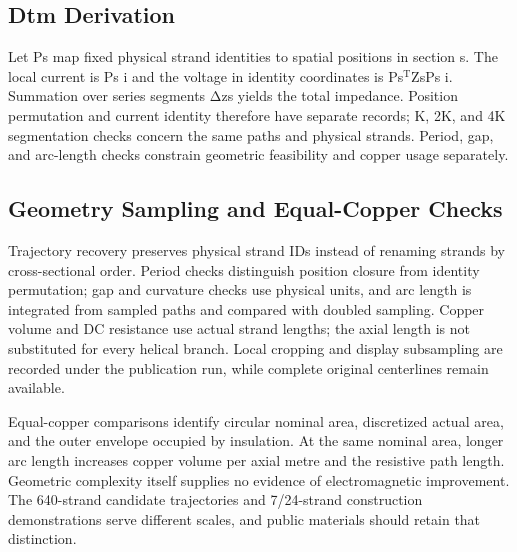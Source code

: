 \documentclass[11pt]{article}
\begin{document}
\subsection*{Dtm Derivation}
\hypertarget{05.dtm_derivation.heading}{}
Let Ps map fixed physical strand identities to spatial positions in section s. The local current is Ps i and the voltage in identity coordinates is Ps\(^{\mathrm T}\)ZsPs i. Summation over series segments Δzs yields the total impedance. Position permutation and current identity therefore have separate records; K, 2K, and 4K segmentation checks concern the same paths and physical strands. Period, gap, and arc-length checks constrain geometric feasibility and copper usage separately.


\subsection*{Geometry Sampling and Equal-Copper Checks}
\hypertarget{05.report_geometry.heading}{}
Trajectory recovery preserves physical strand IDs instead of renaming strands by cross-sectional order. Period checks distinguish position closure from identity permutation; gap and curvature checks use physical units, and arc length is integrated from sampled paths and compared with doubled sampling. Copper volume and DC resistance use actual strand lengths; the axial length is not substituted for every helical branch. Local cropping and display subsampling are recorded under the publication run, while complete original centerlines remain available.


Equal-copper comparisons identify circular nominal area, discretized actual area, and the outer envelope occupied by insulation. At the same nominal area, longer arc length increases copper volume per axial metre and the resistive path length. Geometric complexity itself supplies no evidence of electromagnetic improvement. The 640-strand candidate trajectories and 7/24-strand construction demonstrations serve different scales, and public materials should retain that distinction.
\end{document}

